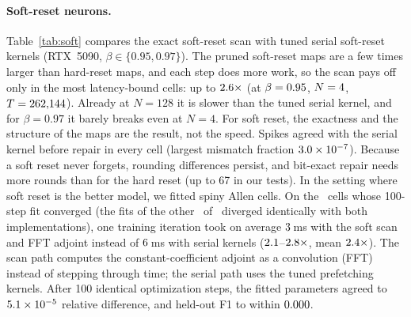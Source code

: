 \documentclass[10pt]{article}
\theoremstyle{remark}
\begin{document}
\paragraph{Soft-reset neurons.}
Table~\ref{tab:soft} compares the exact soft-reset scan with tuned serial soft-reset kernels (RTX~5090, $\beta\in\{0.95,0.97\}$). The pruned soft-reset maps are a few times larger than hard-reset maps, and each step does more work, so the scan pays off only in the most latency-bound cells: up to $2.6\times$ (at $\beta=0.95$, $N=4$, $T=262{,}144$). Already at $N=128$ it is slower than the tuned serial kernel, and for $\beta=0.97$ it barely breaks even at $N=4$. For soft reset, the exactness and the structure of the maps are the result, not the speed. Spikes agreed with the serial kernel before repair in every cell (largest mismatch fraction $3.0\times10^{-7}$). Because a soft reset never forgets, rounding differences persist, and bit-exact repair needs more rounds than for the hard reset (up to 67 in our tests). In the setting where soft reset is the better model, we fitted spiny Allen cells. On the \SoftAllenCells\ cells whose 100-step fit converged (the fits of the other \SoftAllenDiverged\ of \SoftAllenTested\ diverged identically with both implementations), one training iteration took on average $3$\,ms with the soft scan and FFT adjoint instead of $6$\,ms with serial kernels ($2.1$--$2.8\times$, mean $2.4\times$). The scan path computes the constant-coefficient adjoint as a convolution (FFT) instead of stepping through time; the serial path uses the tuned prefetching kernels. After 100 identical optimization steps, the fitted parameters agreed to $5.1\times10^{-5}$ relative difference, and held-out F1 to within $0.000$.

\begin{table}[t]
\centering\small

\caption{Soft-reset LIF forward pass: tuned serial kernels vs.\ the exact soft-reset scan (RTX~5090, inputs $\mathcal N(0.15,0.4^2)$; each implementation tuned per cell). ``Pieces'': mean number of pieces of the pruned chunk maps.}
\label{tab:soft}
\end{table}
\end{document}
